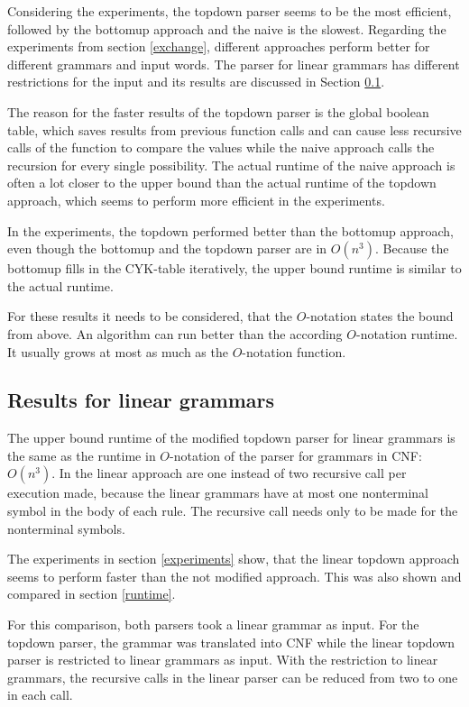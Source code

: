 \documentclass[a4paper, 11pt]{article}
\begin{document}
Considering the experiments, the topdown parser seems to be the most efficient, followed by the bottomup approach and the naive is the slowest. Regarding the experiments from section \ref{exchange}, different approaches perform better for different grammars and input words. 
The parser for linear grammars has different restrictions for the input and its results are discussed in Section \ref{results_linear}. 

The reason for the faster results of the topdown parser is the global boolean table, which saves results from previous function calls and can cause less recursive calls of the function to compare the values while the naive approach calls the recursion for every single possibility. The actual runtime of the naive approach is often a lot closer to the upper bound than the actual runtime of the topdown approach, which seems to perform more efficient in the experiments.

In the experiments, the topdown performed better than the bottomup approach, even though the bottomup and the topdown parser are in $O(n^3)$. Because the bottomup fills in the CYK-table iteratively, the upper bound runtime is similar to the actual runtime.

For these results it needs to be considered, that the $O$-notation states the bound from above. An algorithm can run better than the according $O$-notation runtime. It usually grows at most as much as the $O$-notation function. \cite{bigO}

\subsection{Results for linear grammars}
\label{results_linear}

The upper bound runtime of the modified topdown parser for linear grammars is the same as the runtime in $O$-notation of the parser for grammars in CNF: $O(n^3)$. In the linear approach are one instead of two recursive call per execution made, because the linear grammars have at most one nonterminal symbol in the body of each rule. The recursive call needs only to be made for the nonterminal symbols. 

The experiments in section \ref{experiments} show, that the linear topdown approach seems to perform faster than the not modified approach. This was also shown and compared in section \ref{runtime}.

For this comparison, both parsers took a linear grammar as input. For the topdown parser, the grammar was translated into CNF while the linear topdown parser is restricted to linear grammars as input. With the restriction to linear grammars, the recursive calls in the linear parser can be reduced from two to one in each call.
\end{document}
